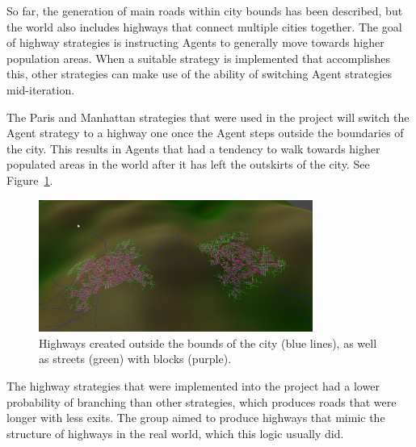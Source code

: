 So far, the generation of main roads within city bounds has been described, but the world also includes highways that connect multiple cities together.
The goal of highway strategies is instructing Agents to generally move towards higher population areas.
When a suitable strategy is implemented that accomplishes this, other strategies can make use of the ability of switching Agent strategies mid-iteration.

The Paris and Manhattan strategies that were used in the project will switch the Agent strategy to a highway one once the Agent steps outside the boundaries of the city.
This results in Agents that had a tendency to walk towards higher populated areas in the world after it has left the outskirts of the city.
See Figure~\ref{fig:road_highways}.

\begin{figure}[H]
  \centering

  \includegraphics[width=0.8\textwidth]{figure/road_highways.png}
  \caption{Highways created outside the bounds of the city (blue lines), as well as streets (green) with blocks (purple).}

  \label{fig:road_highways}
\end{figure}

The highway strategies that were implemented into the project had a lower probability of branching than other strategies, which produces roads that were longer with less exits.
The group aimed to produce highways that mimic the structure of highways in the real world, which this logic usually did.
